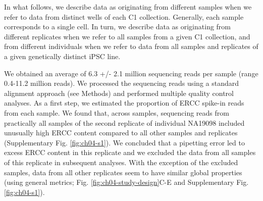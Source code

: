 \begin{figure}
\end{figure}

In what follows, we describe data as originating from different
samples when we refer to data from distinct wells of each C1
collection.  Generally, each sample corresponds to a single cell. In
turn, we describe data as originating from different replicates when
we refer to all samples from a given C1 collection, and from different
individuals when we refer to data from all samples and replicates of a
given genetically distinct iPSC line.

We obtained an average of 6.3 +/- 2.1 million sequencing reads per
sample (range 0.4-11.2 million reads). We processed the sequencing
reads using a standard alignment approach (see Methods) and performed
multiple quality control analyses. As a first step, we estimated the
proportion of ERCC spike-in reads from each sample. We found that,
across samples, sequencing reads from practically all samples of the
second replicate of individual NA19098 included unusually high ERCC
content compared to all other samples and replicates (Supplementary
Fig. \ref{fig:ch04-s1}). We concluded that a pipetting error led to
excess ERCC content in this replicate and we excluded the data from
all samples of this replicate in subsequent analyses. With the
exception of the excluded samples, data from all other replicates seem
to have similar global properties (using general metrics;
Fig. \ref{fig:ch04-study-design}C-E and Supplementary
Fig. \ref{fig:ch04-s1}).

